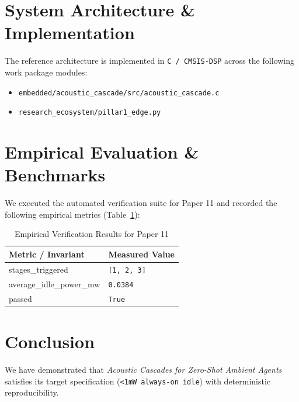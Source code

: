 \documentclass[10pt,twocolumn]{article}
\begin{document}
\section{System Architecture \& Implementation}
The reference architecture is implemented in \texttt{C / CMSIS-DSP} across the following work package modules:
\begin{itemize}
  \item \texttt{embedded/acoustic\_cascade/src/acoustic\_cascade.c}
  \item \texttt{research\_ecosystem/pillar1\_edge.py}
\end{itemize}

\section{Empirical Evaluation \& Benchmarks}
We executed the automated verification suite for Paper 11 and recorded the following empirical metrics (Table~\ref{tab:metrics}):

\begin{table}[htbp]
\centering
\caption{Empirical Verification Results for Paper 11}
\label{tab:metrics}
\begin{tabular}{ll}
\toprule
\textbf{Metric / Invariant} & \textbf{Measured Value} \\
\midrule
    stages\_triggered & \texttt{[1, 2, 3]} \\
    average\_idle\_power\_mw & \texttt{0.0384} \\
    passed & \texttt{True} \\
\bottomrule
\end{tabular}
\end{table}

\section{Conclusion}
We have demonstrated that \textit{Acoustic Cascades for Zero-Shot Ambient Agents} satisfies its target specification (\texttt{<1mW always-on idle}) with deterministic reproducibility.



\end{document}
